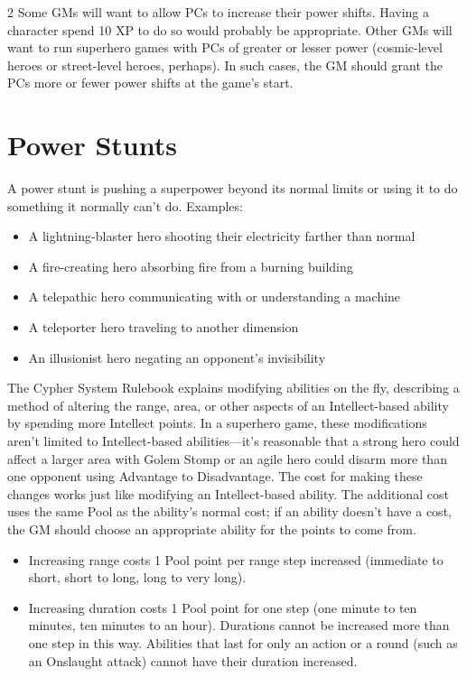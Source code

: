 \begin{multicols}{2}
Some GMs will want to allow PCs to increase their power shifts. Having a character spend 10 XP to do so would probably be appropriate. Other GMs will want to run superhero games with PCs of greater or lesser power (cosmic-level heroes or street-level heroes, perhaps). In such cases, the GM should grant the PCs more or fewer power shifts at the game’s start.

\section{Power Stunts}

A power stunt is pushing a superpower beyond its normal limits or using it to do something it normally can’t do. Examples:

\begin{itemize}
\item A lightning-blaster hero shooting their electricity farther than normal
\item A fire-creating hero absorbing fire from a burning building
\item A telepathic hero communicating with or understanding a machine
\item A teleporter hero traveling to another dimension
\item An illusionist hero negating an opponent’s invisibility
\end{itemize}

The Cypher System Rulebook explains modifying abilities on the fly, describing a method of altering the range, area, or other aspects of an Intellect-based ability by spending more Intellect points. In a superhero game, these modifications aren’t limited to Intellect-based abilities—it’s reasonable that a strong hero could affect a larger area with Golem Stomp or an agile hero could disarm more than one opponent using Advantage to Disadvantage. The cost for making these changes works just like modifying an Intellect-based ability. The additional cost uses the same Pool as the ability’s normal cost; if an ability doesn’t have a cost, the GM should choose an appropriate ability for the points to come from.

\begin{itemize}
\item Increasing range costs 1 Pool point per range step increased (immediate to short, short to long, long to very long).
\item Increasing duration costs 1 Pool point for one step (one minute to ten minutes, ten minutes to an hour). Durations cannot be increased more than one step in this way. Abilities that last for only an action or a round (such as an Onslaught attack) cannot have their duration increased.
\end{itemize}


\end{multicols}
